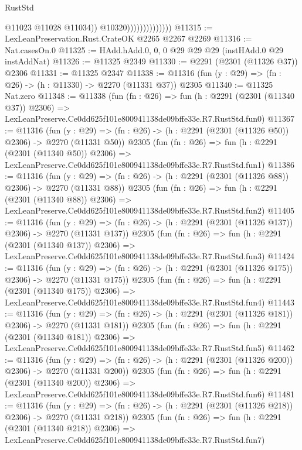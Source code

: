 \begin{lexlean}{RustStd}
\begin{coremodule}
                                    @11023
                                    @11028
                                    @11034))
                                @10320))))))))))))))
@11315 := LexLeanPreservation.Rust.CrateOK @2265 @2267 @2269
@11316 := Nat.casesOn.{0}
@11325 := HAdd.hAdd.{0, 0, 0} @29 @29 @29 (instHAdd.{0} @29 instAddNat)
@11326 := @11325 @2349
@11330 := @2291 (@2301 (@11326 @37)) @2306
@11331 := @11325 @2347
@11338 := @11316 (fun (y : @29) => (fn : @26) -> (h : @11330) -> @2270 (@11331 @37)) @2305
@11340 := @11325 Nat.zero
@11348 := @11338
    (fun (fn : @26) =>
    fun (h : @2291 (@2301 (@11340 @37)) @2306) =>
    LexLeanPreserve.Ce0dd625f101e800941138de09bffe33e.R7.RustStd.fun0)
@11367 := @11316
    (fun (y : @29) => (fn : @26) -> (h : @2291 (@2301 (@11326 @50)) @2306) -> @2270 (@11331 @50))
    @2305
    (fun (fn : @26) =>
    fun (h : @2291 (@2301 (@11340 @50)) @2306) =>
    LexLeanPreserve.Ce0dd625f101e800941138de09bffe33e.R7.RustStd.fun1)
@11386 := @11316
    (fun (y : @29) => (fn : @26) -> (h : @2291 (@2301 (@11326 @88)) @2306) -> @2270 (@11331 @88))
    @2305
    (fun (fn : @26) =>
    fun (h : @2291 (@2301 (@11340 @88)) @2306) =>
    LexLeanPreserve.Ce0dd625f101e800941138de09bffe33e.R7.RustStd.fun2)
@11405 := @11316
    (fun (y : @29) => (fn : @26) -> (h : @2291 (@2301 (@11326 @137)) @2306) -> @2270 (@11331 @137))
    @2305
    (fun (fn : @26) =>
    fun (h : @2291 (@2301 (@11340 @137)) @2306) =>
    LexLeanPreserve.Ce0dd625f101e800941138de09bffe33e.R7.RustStd.fun3)
@11424 := @11316
    (fun (y : @29) => (fn : @26) -> (h : @2291 (@2301 (@11326 @175)) @2306) -> @2270 (@11331 @175))
    @2305
    (fun (fn : @26) =>
    fun (h : @2291 (@2301 (@11340 @175)) @2306) =>
    LexLeanPreserve.Ce0dd625f101e800941138de09bffe33e.R7.RustStd.fun4)
@11443 := @11316
    (fun (y : @29) => (fn : @26) -> (h : @2291 (@2301 (@11326 @181)) @2306) -> @2270 (@11331 @181))
    @2305
    (fun (fn : @26) =>
    fun (h : @2291 (@2301 (@11340 @181)) @2306) =>
    LexLeanPreserve.Ce0dd625f101e800941138de09bffe33e.R7.RustStd.fun5)
@11462 := @11316
    (fun (y : @29) => (fn : @26) -> (h : @2291 (@2301 (@11326 @200)) @2306) -> @2270 (@11331 @200))
    @2305
    (fun (fn : @26) =>
    fun (h : @2291 (@2301 (@11340 @200)) @2306) =>
    LexLeanPreserve.Ce0dd625f101e800941138de09bffe33e.R7.RustStd.fun6)
@11481 := @11316
    (fun (y : @29) => (fn : @26) -> (h : @2291 (@2301 (@11326 @218)) @2306) -> @2270 (@11331 @218))
    @2305
    (fun (fn : @26) =>
    fun (h : @2291 (@2301 (@11340 @218)) @2306) =>
    LexLeanPreserve.Ce0dd625f101e800941138de09bffe33e.R7.RustStd.fun7)

\end{coremodule}
\end{lexlean}
